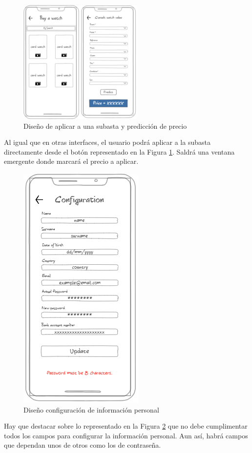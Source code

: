 \begin{figure}[H]
    \centering
    \includegraphics[width=0.6\linewidth]{img/image5.png}
    \caption{Diseño de aplicar a una subasta y predicción de precio}
    \label{fig:image5}
\end{figure}

	Al igual que en otras interfaces, el usuario podrá aplicar a la subasta directamente desde el botón representado en la Figura \ref{fig:image5}. Saldrá una ventana emergente donde marcará el precio a aplicar.
	
\begin{figure}[H]
    \centering
    \includegraphics[width=0.6\linewidth]{img/image6.png}
    \caption{Diseño configuración de información personal}
    \label{fig:image6}
\end{figure}

	Hay que destacar sobre lo representado en la Figura \ref{fig:image6} que no debe cumplimentar todos los campos para configurar la información personal. Aun así, habrá campos que dependan unos de otros como los de contraseña.
